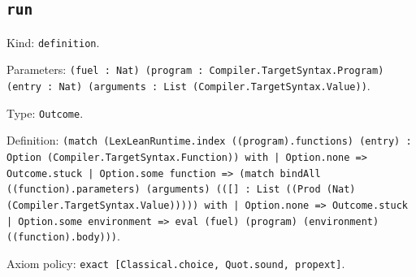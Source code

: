 \documentclass[11pt]{article}
\begin{document}
\subsection*{\texttt{run}}
\noindent Kind: \texttt{definition}.\par
\noindent Parameters: \texttt{(fuel : Nat) (program : Compiler.TargetSyntax.Program) (entry : Nat) (arguments : List (Compiler.TargetSyntax.Value))}.\par
\noindent Type: \texttt{Outcome}.\par
\noindent Definition: \texttt{(match (LexLeanRuntime.index ((program).functions) (entry) : Option (Compiler.TargetSyntax.Function)) with | Option.none => Outcome.stuck | Option.some function => (match bindAll ((function).parameters) (arguments) (([] : List ((Prod (Nat) (Compiler.TargetSyntax.Value))))) with | Option.none => Outcome.stuck | Option.some environment => eval (fuel) (program) (environment) ((function).body)))}.\par
\noindent Axiom policy: \texttt{exact [Classical.choice, Quot.sound, propext]}.\par
\end{document}

